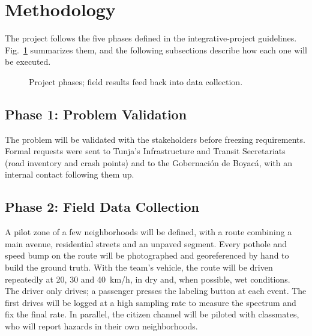 \documentclass[journal,10pt]{IEEEtran}
\begin{document}
\section{Methodology}
The project follows the five phases defined in the integrative-project guidelines. Fig.~\ref{fig:phases} summarizes them, and the following subsections describe how each one will be executed.

\begin{figure}[!t]
\centering
{}
\caption{Project phases; field results feed back into data collection.}
\label{fig:phases}
\end{figure}

\subsection{Phase 1: Problem Validation}
The problem will be validated with the stakeholders before freezing requirements. Formal requests were sent to Tunja's Infrastructure and Transit Secretariats (road inventory and crash points) and to the Gobernaci\'on de Boyac\'a, with an internal contact following them up.

\subsection{Phase 2: Field Data Collection}
A pilot zone of a few neighborhoods will be defined, with a route combining a main avenue, residential streets and an unpaved segment. Every pothole and speed bump on the route will be photographed and georeferenced by hand to build the ground truth. With the team's vehicle, the route will be driven repeatedly at 20, 30 and 40~km/h, in dry and, when possible, wet conditions. The driver only drives; a passenger presses the labeling button at each event. The first drives will be logged at a high sampling rate to measure the spectrum and fix the final rate. In parallel, the citizen channel will be piloted with classmates, who will report hazards in their own neighborhoods.
\end{document}
